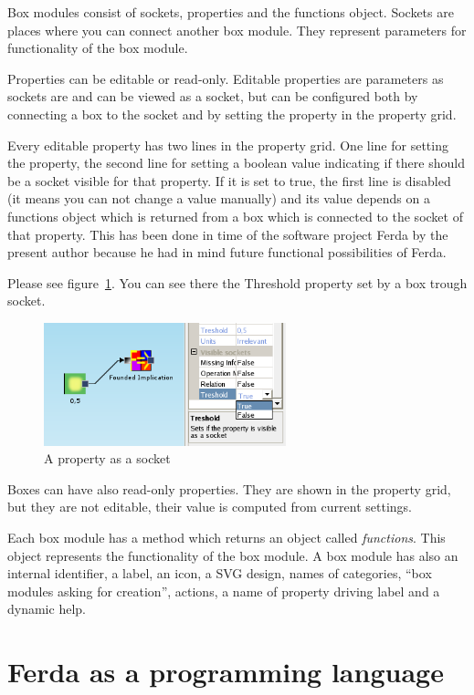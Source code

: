 \documentclass[a4paper,12pt]{book}
\begin{document}
Box modules consist of sockets, properties and the functions object. Sockets are places where you can connect another box module. They represent parameters for functionality of the box module.

Properties can be editable or read-only. Editable properties are parameters as sockets are and can be viewed as a socket, but can be configured both by connecting a box to the socket and by setting the property in the property grid.

Every editable property has two lines in the property grid. One line for setting the property, the second line for setting a boolean value indicating if there should be a socket visible for that property. If it is set to true, the first line is disabled (it means you can not change a value manually) and its value depends on a functions object which is returned from a box which is connected to the socket of that property. This has been done in time of the software project Ferda by the present author because he had in mind future functional possibilities of Ferda.

Please see figure~\ref{fig:propertyAsASocket}. You can see there the Threshold property set by a box trough socket.

\begin{figure}
	\centering
	\includegraphics[width=7cm]{property_as_socket}
	\caption{A property as a socket}
	\label{fig:propertyAsASocket}
\end{figure}

Boxes can have also read-only properties. They are shown in the property grid, but they are not editable, their value is computed from current settings.

Each box module has a method which returns an object called \emph{functions}. This object represents the functionality of the box module. A box module has also an internal identifier, a label, an icon, a SVG design, names of categories, ``box modules asking for creation'', actions, a name of property driving label and a dynamic help.

\section{Ferda as a programming language}
\newtheorem{mydef}{Definition}
\end{document}
